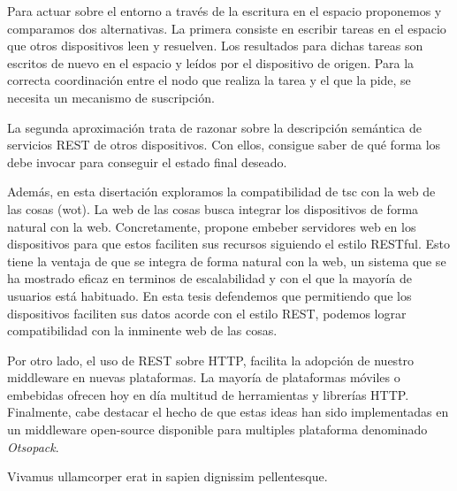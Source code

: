 \begin{resumen}
Para actuar sobre el entorno a través de la escritura en el espacio proponemos y comparamos dos alternativas.
La primera consiste en escribir tareas en el espacio que otros dispositivos leen y resuelven.
Los resultados para dichas tareas son escritos de nuevo en el espacio y leídos por el dispositivo de origen.
Para la correcta coordinación entre el nodo que realiza la tarea y el que la pide, se necesita un mecanismo de suscripción.


La segunda aproximación trata de razonar sobre la descripción semántica de servicios REST de otros dispositivos.
Con ellos, consigue saber de qué forma los debe invocar para conseguir el estado final deseado.


\bigskip


Además, en esta disertación exploramos la compatibilidad de \ac{tsc} con la web de las cosas (\acs{wot}).
La web de las cosas busca integrar los dispositivos de forma natural con la web.
Concretamente, propone embeber servidores web en los dispositivos para que estos faciliten sus recursos siguiendo el estilo RESTful.
Esto tiene la ventaja de que se integra de forma natural con la web, un sistema que se ha mostrado eficaz en terminos de escalabilidad y con el que la mayoría de usuarios está habituado.
En esta tesis defendemos que permitiendo que los dispositivos faciliten sus datos acorde con el estilo REST, podemos lograr compatibilidad con la inminente web de las cosas.


Por otro lado, el uso de REST sobre HTTP, facilita la adopción de nuestro middleware en nuevas plataformas.
La mayoría de plataformas móviles o embebidas ofrecen hoy en día multitud de herramientas y librerías HTTP.
Finalmente, cabe destacar el hecho de que estas ideas han sido implementadas en un middleware open-source disponible para multiples plataforma denominado \emph{Otsopack}.


\end{resumen}



\begin{laburpena}        %


Vivamus ullamcorper erat in sapien dignissim pellentesque.


\end{laburpena}




